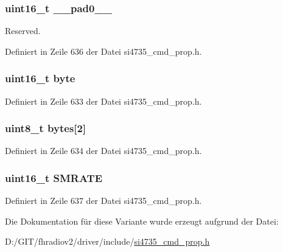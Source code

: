 \subsubsection[{\+\_\+\+\_\+pad0\+\_\+\+\_\+}]{\setlength{\rightskip}{0pt plus 5cm}uint16\+\_\+t \+\_\+\+\_\+pad0\+\_\+\+\_\+}\label{unionfm__soft__mute__rate_a77132c2c26a75f5b8751b235cda23828}


Reserved. 



Definiert in Zeile 636 der Datei si4735\+\_\+cmd\+\_\+prop.\+h.

\hypertarget{unionfm__soft__mute__rate_ab0549c1b5ea980a02e7eab77e21fea49}{}
\subsubsection[{byte}]{\setlength{\rightskip}{0pt plus 5cm}uint16\+\_\+t byte}\label{unionfm__soft__mute__rate_ab0549c1b5ea980a02e7eab77e21fea49}


Definiert in Zeile 633 der Datei si4735\+\_\+cmd\+\_\+prop.\+h.

\hypertarget{unionfm__soft__mute__rate_a46e4c05d20a047ec169f60d3167e912e}{}
\subsubsection[{bytes}]{\setlength{\rightskip}{0pt plus 5cm}uint8\+\_\+t bytes\mbox{[}2\mbox{]}}\label{unionfm__soft__mute__rate_a46e4c05d20a047ec169f60d3167e912e}


Definiert in Zeile 634 der Datei si4735\+\_\+cmd\+\_\+prop.\+h.

\hypertarget{unionfm__soft__mute__rate_aee04360e3c9299f145d4143333baaf9a}{}
\subsubsection[{S\+M\+R\+A\+T\+E}]{\setlength{\rightskip}{0pt plus 5cm}uint16\+\_\+t S\+M\+R\+A\+T\+E}\label{unionfm__soft__mute__rate_aee04360e3c9299f145d4143333baaf9a}


Definiert in Zeile 637 der Datei si4735\+\_\+cmd\+\_\+prop.\+h.



Die Dokumentation für diese Variante wurde erzeugt aufgrund der Datei\+:\begin{DoxyCompactItemize}
\item 
D\+:/\+G\+I\+T/fhradiov2/driver/include/\hyperlink{si4735__cmd__prop_8h}{si4735\+\_\+cmd\+\_\+prop.\+h}\end{DoxyCompactItemize}
